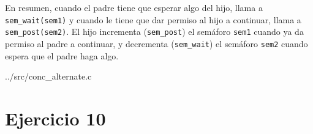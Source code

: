 \documentclass{article}
\begin{document}

En resumen, cuando el padre tiene que esperar algo del hijo, llama a \texttt{sem\_wait(sem1)} y cuando le tiene que dar permiso al hijo a continuar, llama a \texttt{sem\_post(sem2)}. El hijo incrementa (\texttt{sem\_post}) el semáforo \texttt{sem1} cuando ya da permiso al padre a continuar, y decrementa (\texttt{sem\_wait}) el semáforo \texttt{sem2} cuando espera que el padre haga algo.

\begin {tcolorbox}[colback=green!5!white]

{../src/conc_alternate.c}
\end{tcolorbox}

\section*{Ejercicio 10}
\end{document}
